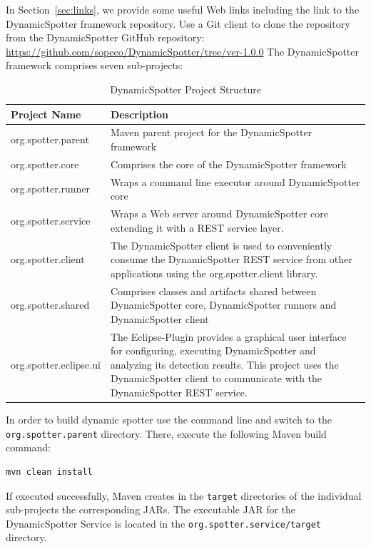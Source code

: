 \documentclass{report}
\newcommand{\DS}{DynamicSpotter }
\newcommand{\link}[1]{\textcolor[rgb]{0.0,0.0,1.0}{\href{#1}{#1}}}
\begin{document}
In Section~\ref{sec:links}, we provide some useful Web links including the link to the \DS framework repository. 
Use a Git client to clone the repository from the \DS GitHub repository:
\newline
\newline
\link{https://github.com/sopeco/DynamicSpotter/tree/ver-1.0.0}
\newline
\newline
The \DS framework comprises seven sub-projects:

\begin{table}[h]
\centering
\begin{tabular}{p{}p{}}
\toprule
 \textbf{Project Name} & \textbf{Description}\\
\midrule
org.spotter.parent & Maven parent project for the \DS framework\\
\midrule
org.spotter.core & Comprises the core of the \DS framework\\
\midrule
org.spotter.runner & Wraps a command line executor around \DS core\\
\midrule
org.spotter.service & Wraps a Web server around \DS core extending it with a REST service layer.\\
\midrule
org.spotter.client & The \DS client is used to conveniently consume the \DS REST service from other applications using
the org.spotter.client library.\\
\midrule
org.spotter.shared & Comprises classes and artifacts shared between \DS core, \DS runners and \DS client\\
\midrule
org.spotter.eclipse.ui & The Eclipse-Plugin provides a graphical user interface for configuring, executing \DS and
analyzing its detection results. This project uses the \DS client to communicate with the \DS REST service.\\
\bottomrule
\end{tabular}
\caption{\DS Project Structure}
\label{tab:projects}
\end{table}

In order to build dynamic spotter use the command line and switch to the \texttt{org.spotter.parent} directory. There,
execute the following Maven build command:
\begin{lstlisting}[language=sh,morekeywords={java,javaagent,port, rootDir}, frame=single]
mvn clean install
\end{lstlisting}
If executed successfully, Maven creates in the \texttt{target} directories of the individual sub-projects the
corresponding JARs. The executable JAR for the \DS Service is located in the \texttt{org.spotter.service/target}
directory. 
\end{document}
